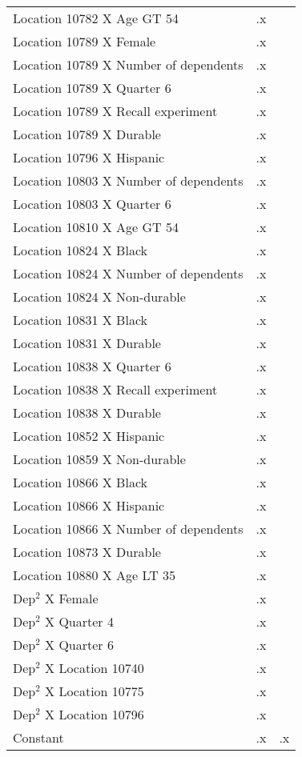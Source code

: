 \begin{tabular}{l*{2}{c}}
Location 10782 X Age GT 54&          .x&            \\
Location 10789 X Female&          .x&            \\
Location 10789 X Number of dependents&          .x&            \\
Location 10789 X Quarter 6&          .x&            \\
Location 10789 X Recall experiment&          .x&            \\
Location 10789 X Durable&          .x&            \\
Location 10796 X Hispanic&          .x&            \\
Location 10803 X Number of dependents&          .x&            \\
Location 10803 X Quarter 6&          .x&            \\
Location 10810 X Age GT 54&          .x&            \\
Location 10824 X Black&          .x&            \\
Location 10824 X Number of dependents&          .x&            \\
Location 10824 X Non-durable&          .x&            \\
Location 10831 X Black&          .x&            \\
Location 10831 X Durable&          .x&            \\
Location 10838 X Quarter 6&          .x&            \\
Location 10838 X Recall experiment&          .x&            \\
Location 10838 X Durable&          .x&            \\
Location 10852 X Hispanic&          .x&            \\
Location 10859 X Non-durable&          .x&            \\
Location 10866 X Black&          .x&            \\
Location 10866 X Hispanic&          .x&            \\
Location 10866 X Number of dependents&          .x&            \\
Location 10873 X Durable&          .x&            \\
Location 10880 X Age LT 35&          .x&            \\
Dep$^2$ X Female    &          .x&            \\
Dep$^2$ X Quarter 4 &          .x&            \\
Dep$^2$ X Quarter 6 &          .x&            \\
Dep$^2$ X Location 10740&          .x&            \\
Dep$^2$ X Location 10775&          .x&            \\
Dep$^2$ X Location 10796&          .x&            \\
Constant            &          .x&          .x\\
\hline\hline
\end{tabular}
